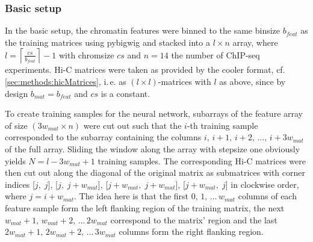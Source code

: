 \subsubsection{Basic setup} \label{sec:methods:basicSetup}

In the basic setup, the chromatin features were binned to the same binsize $b_{feat}$ as the training matrices using pybigwig \xxx
and stacked into a $l \times n$ array, where $l=\left \lceil{\frac{cs}{b_{feat}}}\right \rceil -1$
with chromsize $cs$ and $n=14$ the number of ChIP-seq experiments. 
Hi-C matrices were taken as provided by the cooler format, cf. \cref{sec:methods:hicMatrices}, 
i.\,e. as $(l \times l)$-matrices with $l$ as above, since by design $b_{mat} = b_{feat}$ and $cs$ is a constant.

To create training samples for the neural network, subarrays of the feature array of size $(3w_{mat} \times n)$ 
were cut out such that the $i$-th training sample corresponded to the subarray containing the columns $i,\,i+1,\,i+2,\,\dots,\,i+3w_{mat}$
of the full array. 
Sliding the window along the array with stepsize one obviously yields $N=l-3w_{mat}+1$ training samples.
The corresponding Hi-C matrices were then cut out along the diagonal of the original matrix 
as submatrices with corner indices [$j,\;j$], [$j,\;j+w_{mat}$], [$j+w_{mat},\;j+w_{mat}$], [$j+w_{mat},\;j$] in clockwise order, where $j=i+w_{mat}$.
The idea here is that the first $0,\,1,\,\dots \,w_{mat}$ columns of each feature sample form the left flanking region of the training matrix, 
the next $w_{mat}+1,\,w_{mat}+2,\,\dots \,2w_{mat}$ correspond to the matrix' region and the last $2w_{mat}+1,\,2w_{mat}+2,\,\dots \,3w_{mat}$ columns form the right flanking region.

